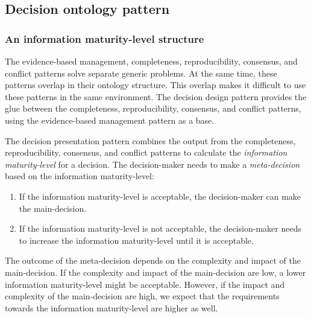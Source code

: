 \subsection{Decision ontology pattern} \label{odp_decision_ontology}
\subsubsection{An information maturity-level structure}
The evidence-based management, completeness, reproducibility, consensus, and conflict patterns solve separate generic problems. At the same time, these patterns overlap in their ontology structure. This overlap makes it difficult to use these patterns in the same environment. The decision design pattern provides the glue between the completeness, reproducibility, consensus, and conflict patterns, using the evidence-based management pattern as a base. 

The decision presentation pattern combines the output from the completeness, reproducibility, consensus, and conflict patterns to calculate the \emph{information maturity-level} for a decision. The decision-maker needs to make a \emph{meta-decision} based on the information maturity-level:
\begin{enumerate}
\item If the information maturity-level is acceptable, the decision-maker can make the main-decision.
\item If the information maturity-level is not acceptable, the decision-maker needs to increase the information maturity-level until it is acceptable.
\end{enumerate}

The outcome of the meta-decision depends on the complexity and impact of the main-decision. If the complexity and impact of the main-decision are low, a lower information maturity-level might be acceptable. However, if the impact and complexity of the main-decision are high, we expect that the requirements towards the information maturity-level are higher as well. 

\begin{center}
\large\color{document}{The decision ontology pattern increases the transparency of the completeness and reliability of decision-relevant information.} 
\end{center}

